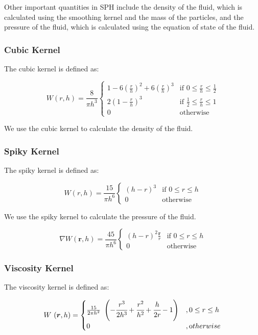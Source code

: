 \documentclass[acmtog]{acmart}
\begin{document}
Other important quantities in SPH include the density of the fluid, which is calculated using the smoothing kernel and the mass of the particles, and the pressure of the fluid, which is calculated using the equation of state of the fluid.

\subsubsection{Cubic Kernel}

The cubic kernel is defined as:

\[
	W(r,h) = \frac{8}{\pi h^3} \begin{cases}
		1 - 6(\frac{r}{h})^2 + 6(\frac{r}{h})^3 & \text{if } 0 \leq \frac{r}{h} \leq \frac{1}{2} \\
		2(1-\frac{r}{h})^3                      & \text{if } \frac{1}{2} \leq \frac{r}{h} \leq 1 \\
		0                                       & \text{otherwise}
	\end{cases}
\]

We use the cubic kernel to calculate the density of the fluid.

\subsubsection{Spiky Kernel}

The spiky kernel is defined as:

\[
	W(r,h) = \frac{15}{\pi h^6} \begin{cases}
		(h - r)^3 & \text{if } 0 \leq r \le h \\
		0         & \text{otherwise}
	\end{cases}
\]

We use the spiky kernel to calculate the pressure of the fluid.

\[
	\nabla W(\boldsymbol{r},h) = \frac{45}{\pi h^6} \begin{cases}
		(h - r)^2\frac{\boldsymbol{r}}{r} & \text{if } 0 \leq r \le h \\
		0                                 & \text{otherwise}
	\end{cases}
\]

\subsubsection{Viscosity Kernel}

The viscosity kernel is defined as:

\[
	W\ (\boldsymbol{r},h)=
	\begin{cases}
		\frac{15}{2\pi h^2}\ \left(-\cfrac{r^3}{2h^3}+\cfrac{r^2}{h^2}+\cfrac{h}{2r}-1\right) & , 0\le r\le h     \\
		0                                                                                     & , \text otherwise \\
	\end{cases}
\]
\end{document}
